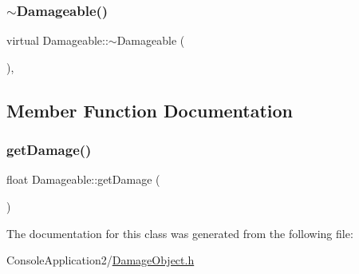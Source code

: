 \hypertarget{class_damageable_a22765a2d6d315def71ad07ef125b2885}{}\label{class_damageable_a22765a2d6d315def71ad07ef125b2885} 
\subsubsection{\texorpdfstring{$\sim$\+Damageable()}{~Damageable()}}
{\footnotesize\ttfamily virtual Damageable\+::$\sim$\+Damageable (\begin{DoxyParamCaption}{ }\end{DoxyParamCaption})\hspace{0.3cm}{\ttfamily [inline]}, {\ttfamily [virtual]}}



\subsection{Member Function Documentation}
\hypertarget{class_damageable_acb416815e3384e6386665fa70e526bbb}{}\label{class_damageable_acb416815e3384e6386665fa70e526bbb} 
\subsubsection{\texorpdfstring{get\+Damage()}{getDamage()}}
{\footnotesize\ttfamily float Damageable\+::get\+Damage (\begin{DoxyParamCaption}{ }\end{DoxyParamCaption})\hspace{0.3cm}{\ttfamily [inline]}}



The documentation for this class was generated from the following file\+:\begin{DoxyCompactItemize}
\item 
Console\+Application2/\hyperlink{_damage_object_8h}{Damage\+Object.\+h}\end{DoxyCompactItemize}
